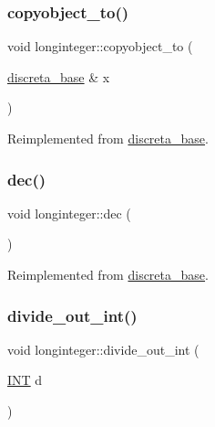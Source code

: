 \subsubsection{\texorpdfstring{copyobject\+\_\+to()}{copyobject\_to()}}
{\footnotesize\ttfamily void longinteger\+::copyobject\+\_\+to (\begin{DoxyParamCaption}\item[{\mbox{\hyperlink{classdiscreta__base}{discreta\+\_\+base}} \&}]{x }\end{DoxyParamCaption})\hspace{0.3cm}{\ttfamily [virtual]}}



Reimplemented from \mbox{\hyperlink{classdiscreta__base_a33180628d9ced231267229b3564790f3}{discreta\+\_\+base}}.

\mbox{\label{classlonginteger_a99be1d0bdcae0dcce47d8d0a09612edf}} 
\subsubsection{\texorpdfstring{dec()}{dec()}}
{\footnotesize\ttfamily void longinteger\+::dec (\begin{DoxyParamCaption}{ }\end{DoxyParamCaption})\hspace{0.3cm}{\ttfamily [virtual]}}



Reimplemented from \mbox{\hyperlink{classdiscreta__base_a11449a5cfa7dc5f5600e012517af6f0f}{discreta\+\_\+base}}.

\mbox{\label{classlonginteger_ac4b65023c8de701153491d80577dfb9b}} 
\subsubsection{\texorpdfstring{divide\+\_\+out\+\_\+int()}{divide\_out\_int()}}
{\footnotesize\ttfamily void longinteger\+::divide\+\_\+out\+\_\+int (\begin{DoxyParamCaption}\item[{\mbox{\hyperlink{galois_8h_a09fddde158a3a20bd2dcadb609de11dc}{I\+NT}}}]{d }\end{DoxyParamCaption})}

